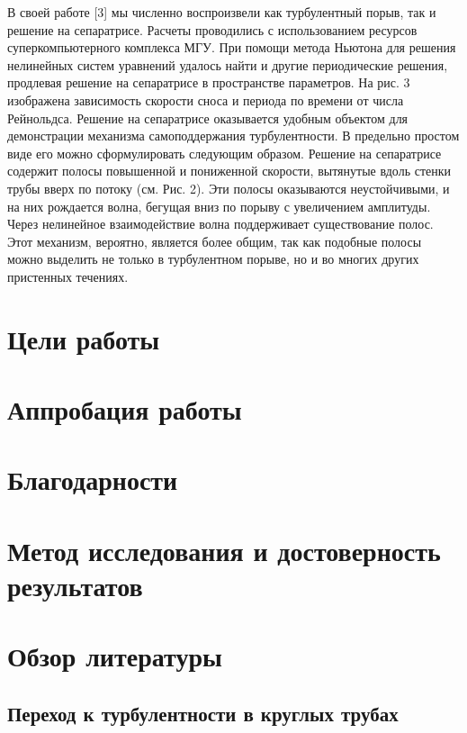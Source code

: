 В своей работе [3] мы численно воспроизвели как турбулентный порыв, так и решение на сепаратрисе. Расчеты проводились с использованием ресурсов суперкомпьютерного комплекса МГУ. При помощи метода Ньютона для решения нелинейных систем уравнений удалось найти и другие периодические решения, продлевая решение на сепаратрисе в пространстве параметров. На рис. 3 изображена зависимость скорости сноса и периода по времени от числа Рейнольдса. Решение на сепаратрисе оказывается удобным объектом для демонстрации механизма самоподдержания турбулентности. В предельно простом виде его можно сформулировать следующим образом. Решение на сепаратрисе содержит полосы повышенной и пониженной скорости, вытянутые вдоль стенки трубы вверх по потоку (см. Рис. 2). Эти полосы оказываются неустойчивыми, и на них рождается волна, бегущая вниз по порыву с увеличением амплитуды. Через нелинейное взаимодействие волна поддерживает существование полос. Этот механизм, вероятно, является более общим, так как подобные полосы можно выделить не только в турбулентном порыве, но и во многих других пристенных течениях.


\section{Цели работы}

\section{Аппробация работы}

\section{Благодарности}

\section{Метод исследования и достоверность результатов}

\section{Обзор литературы}

	\subsection{Переход к турбулентности в круглых трубах}

